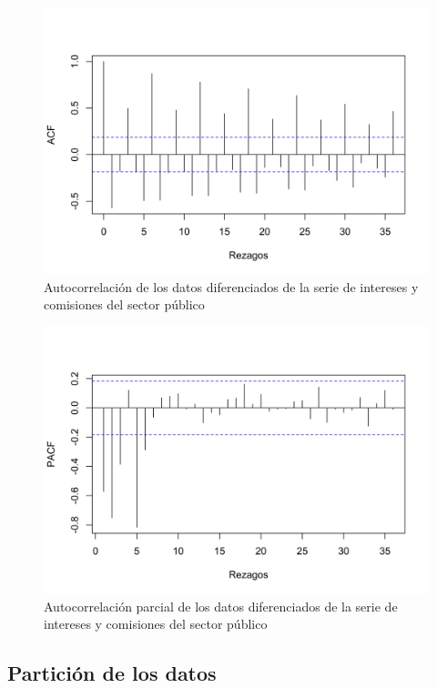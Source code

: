 \documentclass[
]{article}
\begin{document}
\begin{figure}[H]
\includegraphics[width=1\linewidth,height=1\textheight]{Tesis_files/figure-latex/intereses_acf-1} \caption{Autocorrelación de los datos diferenciados de la serie de intereses y comisiones del sector público}\label{fig:intereses_acf}
\end{figure}

\begin{figure}[H]
\includegraphics[width=1\linewidth,height=1\textheight]{Tesis_files/figure-latex/intereses_pacf-1} \caption{Autocorrelación parcial de los datos diferenciados de la serie de intereses y comisiones del sector público}\label{fig:intereses_pacf}
\end{figure}

\subsection{Partición de los datos}
\end{document}
